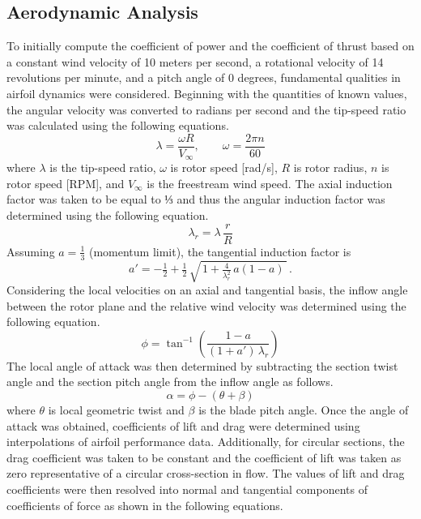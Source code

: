 \documentclass[11pt]{article}
\begin{document}
\subsection{Aerodynamic Analysis}

To initially compute the coefficient of power and the coefficient of thrust based on a constant wind velocity of 10 meters per second, a rotational velocity of 14 revolutions per minute, and a pitch angle of 0 degrees, fundamental qualities in airfoil dynamics were considered. Beginning with the quantities of known values, the angular velocity was converted to radians per second and the tip-speed ratio was calculated using the following equations.
\begin{equation}
\lambda = \frac{\omega R}{V_\infty}, \qquad \omega = \frac{2\pi n}{60}
\label{eq:tsr_omega}
\end{equation}
where \(\lambda\) is the tip-speed ratio, \(\omega\) is rotor speed [rad/s], \(R\) is rotor radius, \(n\) is rotor speed [RPM], and \(V_\infty\) is the freestream wind speed.
The axial induction factor was taken to be equal to ⅓ and thus the angular induction factor was determined using the following equation.
\begin{equation}
\lambda_r = \lambda\, \frac{r}{R}
\label{eq:lambda_r}
\end{equation}
Assuming \(a=\tfrac{1}{3}\) (momentum limit), the tangential induction factor is
\begin{equation}
a' = -\tfrac{1}{2} + \tfrac{1}{2}\, \sqrt{\,1 + \tfrac{4}{\lambda_r^{2}}\, a(1-a)\,}\, .
\label{eq:aprime}
\end{equation}
Considering the local velocities on an axial and tangential basis, the inflow angle between the rotor plane and the relative wind velocity was determined using the following equation.
\begin{equation}
\phi = \tan^{-1}\!\left( \frac{1 - a}{(1 + a')\,\lambda_r} \right)
\label{eq:phi}
\end{equation}
The local angle of attack was then determined by subtracting the section twist angle and the section pitch angle from the inflow angle as follows. 
\begin{equation}
\alpha = \phi - (\theta + \beta)
\label{eq:alpha}
\end{equation}
where \(\theta\) is local geometric twist and \(\beta\) is the blade pitch angle.
Once the angle of attack was obtained, coefficients of lift and drag were determined using interpolations of airfoil performance data. Additionally, for circular sections, the drag coefficient was taken to be constant and the coefficient of lift was taken as zero representative of a circular cross-section in flow. The values of lift and drag coefficients were then resolved into normal and tangential components of coefficients of force as shown in the following equations.
\end{document}
